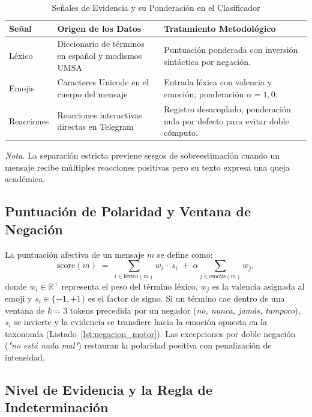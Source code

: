 \begin{table}[htbp]
  \centering
  \small
  \caption{Señales de Evidencia y su Ponderación en el Clasificador}
  \label{tab:senales}
  \begin{tabular}{lp{6.2cm}p{5.5cm}}
    \toprule
    Señal & Origen de los Datos & Tratamiento Metodológico \\
    \midrule
    Léxico & Diccionario de términos en español y modismos UMSA & Puntuación ponderada con inversión sintáctica por negación. \\
    Emojis & Caracteres Unicode en el cuerpo del mensaje & Entrada léxica con valencia y emoción; ponderación $\alpha = 1,0$. \\
    Reacciones & Reacciones interactivas directas en Telegram & Registro desacoplado; ponderación nula por defecto para evitar doble cómputo. \\
    \bottomrule
  \end{tabular}
  \vspace{4pt}
  \begin{minipage}{0.92\textwidth}
    \footnotesize
    \textit{Nota.} La separación estricta previene sesgos de sobreestimación cuando un mensaje recibe múltiples reacciones positivas pero su texto expresa una queja académica.
  \end{minipage}
\end{table}

\subsection{Puntuación de Polaridad y Ventana de Negación}

La puntuación afectiva de un mensaje $m$ se define como:
\begin{equation}
\text{score}(m) \;=\; \sum_{i \in \text{l\'exico}(m)} w_i \,\cdot\, s_i
   \;+\; \alpha \sum_{j \in \text{emojis}(m)} w_j ,
\end{equation}
donde $w_i \in \mathbb{R}^+$ representa el peso del término léxico, $w_j$ es la valencia asignada al emoji y $s_i \in \{-1, +1\}$ es el factor de signo. Si un término cae dentro de una ventana de $k=3$ tokens precedida por un negador (\emph{no, nunca, jamás, tampoco}), $s_i$ se invierte y la evidencia se transfiere hacia la emoción opuesta en la taxonomía (Listado~\ref{lst:negacion_motor}). Las excepciones por doble negación (\emph{"no está nada mal"}) restauran la polaridad positiva con penalización de intensidad.

\subsection{Nivel de Evidencia y la Regla de Indeterminación}

